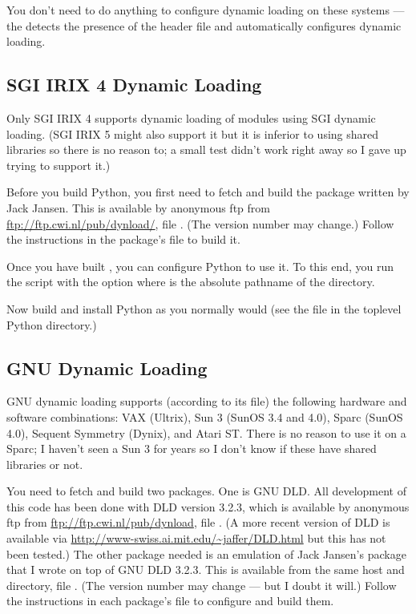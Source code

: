 \documentclass{manual}
\begin{document}
You don't need to do anything to configure dynamic loading on these
systems --- the  detects the presence of the
 header file and automatically configures dynamic
loading.

\subsection{SGI IRIX 4 Dynamic Loading
            \label{irixDynload}}

Only SGI IRIX 4 supports dynamic loading of modules using SGI dynamic
loading.  (SGI IRIX 5 might also support it but it is inferior to
using shared libraries so there is no reason to; a small test didn't
work right away so I gave up trying to support it.)

Before you build Python, you first need to fetch and build the
 package written by Jack Jansen.  This is available by
anonymous ftp from \url{ftp://ftp.cwi.nl/pub/dynload/}, file
.  (The version number may change.)  Follow the
instructions in the package's  file to build it.

Once you have built , you can configure Python to use it.  To
this end, you run the  script with the option
 where  is the absolute
pathname of the  directory.

Now build and install Python as you normally would (see the
 file in the toplevel Python directory.)

\subsection{GNU Dynamic Loading
            \label{gnuDynload}}

GNU dynamic loading supports (according to its  file) the
following hardware and software combinations: VAX (Ultrix), Sun 3
(SunOS 3.4 and 4.0), Sparc (SunOS 4.0), Sequent Symmetry (Dynix), and
Atari ST.  There is no reason to use it on a Sparc; I haven't seen a
Sun 3 for years so I don't know if these have shared libraries or not.

You need to fetch and build two packages.
One is GNU DLD.  All development of this code has been done with DLD
version 3.2.3, which is available by anonymous ftp from
\url{ftp://ftp.cwi.nl/pub/dynload}, file
.  (A more recent version of DLD is available
via \url{http://www-swiss.ai.mit.edu/~jaffer/DLD.html} but this has
not been tested.)
The other package needed is an
emulation of Jack Jansen's  package that I wrote on top of
GNU DLD 3.2.3.  This is available from the same host and directory,
file .  (The version number may change --- but I doubt
it will.)  Follow the instructions in each package's 
file to configure and build them.
\end{document}
